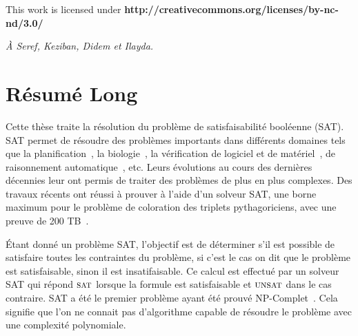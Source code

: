 ﻿\clearpage\null\vfill
\thispagestyle{empty}
\begin{minipage}[b]{.9\textwidth}
  \begin{center}
  \setlength{\parskip}{.5\baselineskip}
  {\color{phdcol0}%
   \ccLogo\hspace{.1cm}%
   \ccAttribution\hspace{.1cm}%
   \ccNonCommercial\hspace{.1cm}%
   \ccNoDerivatives}\hspace{.15cm}%
  \footnotesize%
  This work is licensed under {\color{phdcol1}\textbf{http://creativecommons.org/licenses/by-nc-nd/3.0/}}
  \end{center}
\end{minipage}
\vspace*{2\baselineskip}
\clearpage
\thispagestyle{empty}
\begin{flushright}
  \textit{À Seref, Keziban, Didem et Ilayda.}
\end{flushright}
%
%
%
%
\chapter*{Résumé Long}

Cette thèse traite la résolution du problème de satisfaisabilité booléenne (SAT).
SAT permet de résoudre des problèmes importants dans différents domaines tels 
que la planification~\cite{planning_92}, la biologie~\cite{biology_06}, la vérification de logiciel et de 
matériel~\cite{biere1999symbolic}, de raisonnement automatique~\cite{heule2016solving}, etc.
Leurs évolutions au cours des dernières décennies leur ont permis de traiter des problèmes de plus en plus complexes.
Des travaux récents ont réussi à prouver à l'aide d'un solveur SAT, une borne maximum
pour le problème de coloration des triplets pythagoriciens, avec une preuve de 200 TB~\cite{heule2016solving}.

Étant donné un problème SAT, l'objectif est de  déterminer s'il est possible de satisfaire toutes les contraintes du
problème, si c'est le cas on dit que le problème est satisfaisable, sinon il est insatifaisable.
%
Ce calcul est effectué par un solveur SAT qui répond $\textsc{sat}$ lorsque la formule est satisfaisable et $\textsc{unsat}$ dans le cas
contraire. SAT a été le premier problème ayant été prouvé NP-Complet~\cite{cook1971complexity}. Cela signifie que
l'on ne connait pas d'algorithme capable de résoudre le problème avec une complexité polynomiale.

